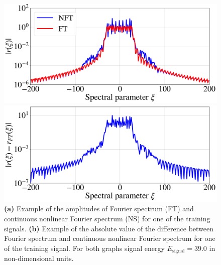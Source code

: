 \begin{figure}[ht]
\centering
\begin{minipage}{.49\textwidth}
  \centering
  \includegraphics[width=1.\linewidth]{images/nn_nft/scirep_ft_vs_nft_actual.pdf}
\end{minipage}%
\begin{minipage}{.49\textwidth}
  \centering
  \includegraphics[width=1.\linewidth]{images/nn_nft/scirep_ft_vs_nft.pdf}
\end{minipage}
\caption{\textbf{(a)} Example of the amplitudes of Fourier spectrum (FT) and continuous nonlinear Fourier spectrum (NS) for one of the training signals. \textbf{(b)} Example of the absolute value of the difference between Fourier spectrum and continuous nonlinear Fourier spectrum for one of the training signal. For both graphs signal energy $E_{\text{signal}} = 39.0$ in non-dimensional units.}
\label{fig:nft_and_ft}
\end{figure}


